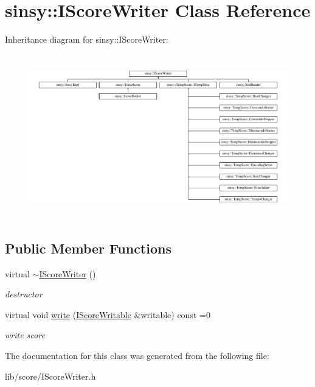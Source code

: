 \hypertarget{classsinsy_1_1IScoreWriter}{\section{sinsy\-:\-:\-I\-Score\-Writer \-Class \-Reference}
\label{classsinsy_1_1IScoreWriter}
}
\-Inheritance diagram for sinsy\-:\-:\-I\-Score\-Writer\-:\begin{figure}[H]
\begin{center}
\leavevmode
\includegraphics[height=7.148936cm]{classsinsy_1_1IScoreWriter}
\end{center}
\end{figure}
\subsection*{\-Public \-Member \-Functions}
\begin{DoxyCompactItemize}
\item 
\hypertarget{classsinsy_1_1IScoreWriter_aca80577a76a852831ec4a95ae03117d0}{virtual \hyperlink{classsinsy_1_1IScoreWriter_aca80577a76a852831ec4a95ae03117d0}{$\sim$\-I\-Score\-Writer} ()}\label{classsinsy_1_1IScoreWriter_aca80577a76a852831ec4a95ae03117d0}

\begin{DoxyCompactList}\small\item\em destructor \end{DoxyCompactList}\item 
\hypertarget{classsinsy_1_1IScoreWriter_a15b81f3e78834610052da3cc48e0f7ad}{virtual void \hyperlink{classsinsy_1_1IScoreWriter_a15b81f3e78834610052da3cc48e0f7ad}{write} (\hyperlink{classsinsy_1_1IScoreWritable}{\-I\-Score\-Writable} \&writable) const =0}\label{classsinsy_1_1IScoreWriter_a15b81f3e78834610052da3cc48e0f7ad}

\begin{DoxyCompactList}\small\item\em write score \end{DoxyCompactList}\end{DoxyCompactItemize}


\-The documentation for this class was generated from the following file\-:\begin{DoxyCompactItemize}
\item 
lib/score/\-I\-Score\-Writer.\-h\end{DoxyCompactItemize}
